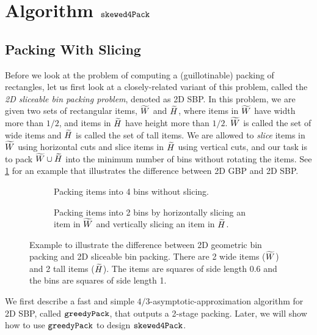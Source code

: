 \section{Algorithm \texorpdfstring{$\operatorname{\mathtt{skewed4Pack}}$}{thin4Pack}}
\label{sec:thin-gpack}

\subsection{Packing With Slicing}

Before we look at the problem of computing a (guillotinable) packing of \thin{} rectangles,
let us first look at a closely-related variant of this problem,
called the \emph{2D sliceable bin packing problem}, denoted as 2D SBP.
In this problem, we are given two sets of rectangular items, $\widetilde{W}$ and $\widetilde{H}$, where
items in $\widetilde{W}$ have width more than $1/2$, and items in $\widetilde{H}$ have height more than $1/2$.
$\widetilde{W}$ is called the set of wide items and $\widetilde{H}$ is called the set of tall items.
We are allowed to \emph{slice} items in $\widetilde{W}$ using horizontal cuts
and slice items in $\widetilde{H}$ using vertical cuts, and our task is to pack
$\widetilde{W} \cup \widetilde{H}$ into the minimum number of bins without rotating the items.
See \cref{fig:bp-vs-sbp} for an example that illustrates the difference
between 2D GBP and 2D SBP.

\begin{figure}[htb]
\begin{subfigure}{0.45\textwidth}
\centering

\caption{Packing items into 4 bins without slicing.}
\end{subfigure}
\hfil
\begin{subfigure}{0.45\textwidth}
\centering

\caption{Packing items into 2 bins by horizontally slicing an item in $\widetilde{W}$
and vertically slicing an item in $\widetilde{H}$.}
\end{subfigure}
\caption[2D GBP vs.~2D SBP]%
{Example to illustrate the difference between 2D geometric bin packing
and 2D sliceable bin packing. There are 2 wide items ($\widetilde{W}$) and 2 tall items ($\widetilde{H}$).
The items are squares of side length 0.6 and the bins are squares of side length 1.}
\label{fig:bp-vs-sbp}
\end{figure}

We first describe a fast and simple $4/3$-asymptotic-approximation algorithm
for 2D SBP, called $\operatorname{\mathtt{greedyPack}}$, that outputs a 2-stage packing.
Later, we will show how to use $\operatorname{\mathtt{greedyPack}}$ to design $\operatorname{\mathtt{skewed4Pack}}$.

